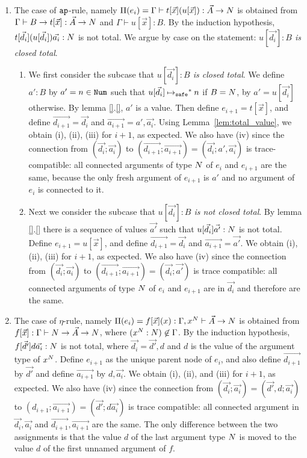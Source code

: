 \documentclass{article}
\newenvironment{proof}[1][Proof]{\begin{trivlist}
\item[\hskip \labelsep {\bfseries #1}]}{\end{trivlist}}
\begin{document}
\begin{proof}
\begin{enumerate}
\item
  The case of ${\tt ap}$-rule, namely 
  $\Pi(e_i) = \Gamma\vdash t[\vec{x}](u[\vec{x}]): \vec{A}\rightarrow{N}$ is obtained from
  $\Gamma\vdash B \rightarrow t[\vec{x}]: \vec{A}\rightarrow{N}$ 
  and $\Gamma\vdash u[\vec{x}]: B$.
  By the induction hypothesis, $t[\vec{d_i}](u[\vec{d_i}])\vec{a_i}:{N}$ is not total.
  We argue by case on the statement: \emph{$u[\vec{d_i}]:B$ is closed total}.

\begin{enumerate}
\item
  We first consider the subcase that \emph{$u[\vec{d_i}]:B$ is closed total}.
  We define $a':B$ by $a' = n\in{\tt Num}$ such that $u[\vec{d_i}] \mathbin{{\mapsto}_{\tiny \tt safe}}^* n$ if $B={N}$,
  by $a' = u[\vec{d_i}]$ otherwise. By lemma \ref{}.\ref{}, $a'$ is a value.
  Then define $e_{i+1}=t[\vec{x}]$,
  and define $\vec{d_{i+1}} = \vec{d_i}$ and $\vec{a_{i+1}} = a',\vec{a_i}$. 
  Using Lemma~\ref{lem:total_value}, we obtain (i), (ii), (iii) for $i+1$, as expected. 
  We also have (iv) since the connection from 
  $(\vec{d_i};\vec{a_i})$ to $(\vec{d_{i+1}};\vec{a_{i+1}}) = (\vec{d_i};a',\vec{a_i})$ is
  trace-compatible: all connected arguments of type ${N}$ of $e_{i}$ and $e_{i+1}$ are the same,
  because the only fresh argument of $e_{i+1}$ is $a'$ and no argument of $e_i$ is connected to it.
\item
  Next we consider the subcase that \emph{$u[\vec{d_i}]:B$ is not closed total}.
  By lemma \ref{}.\ref{}
  there is a sequence of values $\vec{a'}$ such that $u[\vec{d_i}]\vec{a'}:{N}$ is not total.
  Define $e_{i+1}=u[\vec{x}]$,
  and define $\vec{d_{i+1}} = \vec{d_i}$ and $\vec{a_{i+1}} = \vec{a'}$. 
  We obtain (i), (ii), (iii) for $i+1$, as expected.
  We also have (iv) since the connection from 
  $(\vec{d_i};\vec{a_i})$ to $(\vec{d_{i+1}};\vec{a_{i+1}}) = (\vec{d_i};\vec{a'})$ is
  trace compatible: all connected arguments of type ${N}$ of $e_{i}$ and $e_{i+1}$ are 
  in $\vec{d_i}$ and therefore are the same.
 \end{enumerate}

\item
  The case of $\eta$-rule, namely 
  $\Pi(e_i) = f[\vec{x}](x): \Gamma,x^{N}\vdash \vec{A}\rightarrow{N}$ is obtained from
  $f[\vec{x}]:\Gamma\vdash N\rightarrow \vec{A} \rightarrow {N}$, where
  $(x^{N}:{N})\not\in\Gamma$.
  By the induction hypothesis, $f[\vec{d'}]d\vec{a_i}:{N}$ is not total,
  where $\vec{d_i} = \vec{d'},d$ and $d$ is the value of the argument type of $x^{N}$.
  Define $e_{i+1}$ as the unique parent node of $e_i$, and
  also define $\vec{d_{i+1}}$ by $\vec{d'}$ and define $\vec{a_{i+1}}$ by $d,\vec{a_i}$. 
  We obtain (i), (ii), and (iii) for $i+1$, as expected.
  We also have (iv) since the connection from
  $(\vec{d_i};\vec{a_i}) = (\vec{d'},d;\vec{a_i})$ to
  $(d_{i+1};\vec{a_{i+1}}) = (\vec{d'};d\vec{a_i})$
  is trace compatible: all connected argument in $\vec{d_{i}},\vec{a_{i}}$ and 
  $\vec{d_{i+1}},\vec{a_{i+1}}$ are the same. The only difference between the two assignments
  is that the value $d$ of the last argument type ${N}$ is moved to the value $d$ 
  of the first unnamed argument of $f$. 


\end{enumerate}
\end{proof}
\end{document}
